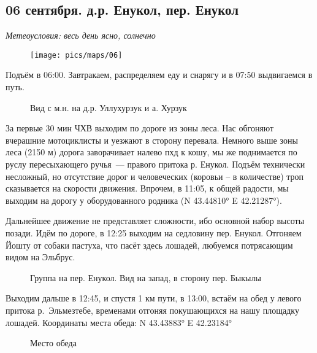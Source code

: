 \subsection{06 сентября. д.р. Енукол, пер. Енукол}
\textit{Метеоусловия: весь день ясно, солнечно}

\begin{figure}[h!]
	\centering
	\texttt{[image: pics/maps/06]}
	\label{fig:06}
\end{figure}

Подъём в 06:00. Завтракаем, распределяем еду и снарягу и в 07:50 выдвигаемся в путь.

\begin{figure}[h!]
	\centering
	\caption{Вид с м.н. на д.р. Уллухурзук и а. Хурзук}
	\label{fig:camp05}
\end{figure}

За первые 30 мин ЧХВ выходим по дороге из зоны леса. Нас обгоняют вчерашние мотоциклисты и уезжают в сторону перевала. Немного выше зоны леса (2150 м) дорога заворачивает налево пхд к кошу, мы же поднимается по руслу пересыхающего ручья~--- правого притока р. Енукол. Подъём технически несложный, но отсутствие дорог и человеческих (коровьи -- в количестве) троп сказывается на скорости движения. Впрочем, в 11:05, к общей радости, мы выходим на дорогу у оборудованного родника (N 43.44810° E 42.21287°).

Дальнейшее движение не представляет сложности, ибо основной набор высоты позади. Идём по дороге, в 12:25 выходим на седловину пер. Енукол. Отгоняем Йошту от собаки пастуха, что пасёт здесь лошадей, любуемся потрясающим видом на Эльбрус.

\begin{figure}[h!]
	\centering
	\caption{Группа на пер. Енукол. Вид на запад, в сторону пер. Быкылы}
	\label{fig:enukol}
\end{figure}

Выходим дальше в 12:45, и спустя 1 км пути, в 13:00, встаём на обед у левого притока р.~Эльмезтебе, временами отгоняя покушающихся на нашу площадку лошадей. Координаты места обеда: N 43.43883° E 42.23184°

\begin{figure}[h!]
	\centering
	\caption{Место обеда}
	\label{fig:06_dinner}
\end{figure}

